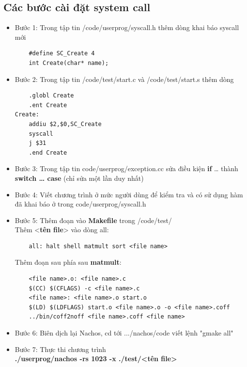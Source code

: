 \documentclass[12pt,a4paper]{article}
\begin{document}
\subsection{Các bước cài đặt system call}
\begin{itemize}
    \item \textnormal{Bước 1: Trong tập tin /code/userprog/syscall.h thêm dòng khai báo syscall mới}\\
    \begin{lstlisting}
    #define SC_Create 4
    int Create(char* name);
    \end{lstlisting}
    \item \textnormal{Bước 2: Trong tập tin /code/test/start.c và /code/test/start.s thêm dòng}\\
    \begin{lstlisting}
    .globl Create
    .ent Create
Create:
    addiu $2,$0,SC_Create
    syscall
    j $31
    .end Create
    \end{lstlisting}
    \item \textnormal{Bước 3:  Trong tập tin code/userprog/exception.cc sửa điều kiện \textbf{if} … thành \textbf{switch … case} (chỉ sửa một lần duy nhất)}
    \item \textnormal{Bước 4: Viết chương trình ở mức người dùng để kiểm tra và có sử dụng hàm đã khai báo ở trong code/userprog/syscall.h}
    \item \textnormal{Bước 5: Thêm đoạn vào \textbf{ Makefile} trong /code/test/}\\
    \textnormal{Thêm <\textbf{tên file}> vào dòng all:}\\
    \begin{lstlisting}
    all: halt shell matmult sort <file name>
    \end{lstlisting}
    \textnormal{Thêm đoạn sau phía sau \textbf{matmult}:}\\
    \begin{lstlisting}
    <file name>.o: <file name>.c
    $(CC) $(CFLAGS) -c <file name>.c
    <file name>: <file name>.o start.o
    $(LD) $(LDFLAGS) start.o <file name>.o -o <file name>.coff
    ../bin/coff2noff <file name>.coff <file name>
    \end{lstlisting}
    \item \textnormal{Bước 6: Biên dịch lại Nachos, cd tới .../nachos/code viết lệnh "gmake all"}
    \item \textnormal{Bước 7: Thực thi chương trình}\\
    \textbf{./userprog/nachos -rs 1023 -x ./test/<tên file>}
\end{itemize}
\end{document}
